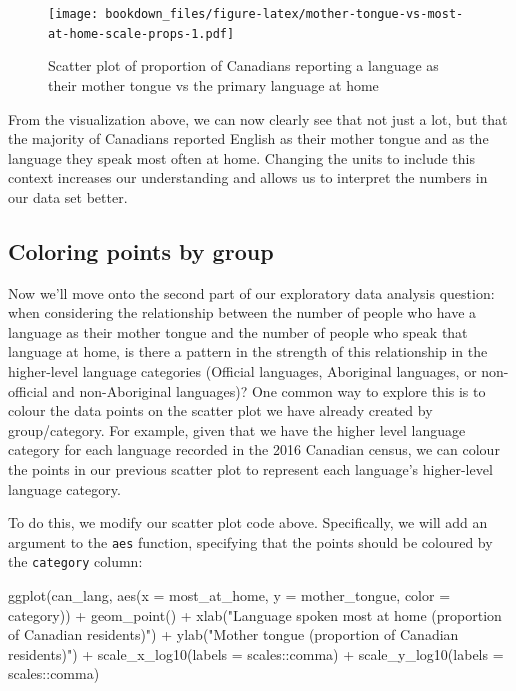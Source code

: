 \documentclass[
]{krantz}
\makeatletter
\newenvironment{Shaded}{\begin{snugshade}}{\end{snugshade}}
\newcommand{\AttributeTok}[1]{\textcolor[rgb]{0.61,0.61,0.61}{#1}}
\newcommand{\FunctionTok}[1]{\textcolor[rgb]{0,0,0}{#1}}
\newcommand{\NormalTok}[1]{#1}
\newcommand{\SpecialCharTok}[1]{\textcolor[rgb]{0,0,0}{#1}}
\newcommand{\StringTok}[1]{\textcolor[rgb]{0.5,0.5,0.5}{#1}}
\newenvironment{kframe}{%
\medskip{}
\setlength{\fboxsep}{.8em}
 \def\at@end@of@kframe{}%
 \ifinner\ifhmode%
  \def\at@end@of@kframe{\end{minipage}}%
  \begin{minipage}{\columnwidth}%
 \fi\fi%
 \def\FrameCommand##1{\hskip\@totalleftmargin \hskip-\fboxsep
 \colorbox{shadecolor}{##1}\hskip-\fboxsep
     \hskip-\linewidth \hskip-\@totalleftmargin \hskip\columnwidth}%
 \MakeFramed {\advance\hsize-\width
   \@totalleftmargin\z@ \linewidth\hsize
   \@setminipage}}%
 {\par\unskip\endMakeFramed%
 \at@end@of@kframe}
\renewenvironment{Shaded}{\begin{kframe}}{\end{kframe}}
\makeatother
\begin{document}
\begin{figure}
\centering
\texttt{[image: bookdown\_files/figure-latex/mother-tongue-vs-most-at-home-scale-props-1.pdf]}
\caption{\label{fig:mother-tongue-vs-most-at-home-scale-props}Scatter plot of proportion of Canadians reporting a language as their mother tongue vs the primary language at home}
\end{figure}

From the visualization above, we can now clearly see that not just a lot, but that the majority of Canadians reported English as their mother tongue and as the language they speak most often at home. Changing the units to include this context increases our understanding and allows us to interpret the numbers in our data set better.

\hypertarget{coloring-points-by-group}{%
\subsection{Coloring points by group}\label{coloring-points-by-group}}

Now we'll move onto the second part of our exploratory data analysis question: when considering the relationship between the number of people who have a language as their mother tongue and the number of people who speak that language at home, is there a pattern in the strength of this relationship in the higher-level language categories (Official languages, Aboriginal languages, or non-official and non-Aboriginal languages)? One common way to explore this is to colour the data points on the
scatter plot we have already created by group/category. For example,
given that we have the higher level language category for each language recorded in the 2016 Canadian census, we can colour the points in our previous
scatter plot to represent each language's higher-level language category.

To do this, we modify our scatter plot code above. Specifically, we will add an argument to the \texttt{aes} function, specifying that the points should be coloured by the \texttt{category} column:

\begin{Shaded}
\begin{Highlighting}[]
\FunctionTok{ggplot}\NormalTok{(can\_lang, }\FunctionTok{aes}\NormalTok{(}\AttributeTok{x =}\NormalTok{ most\_at\_home, }\AttributeTok{y =}\NormalTok{ mother\_tongue, }\AttributeTok{color =}\NormalTok{ category)) }\SpecialCharTok{+}
  \FunctionTok{geom\_point}\NormalTok{() }\SpecialCharTok{+}
  \FunctionTok{xlab}\NormalTok{(}\StringTok{"Language spoken most at home (proportion of Canadian residents)"}\NormalTok{) }\SpecialCharTok{+}
  \FunctionTok{ylab}\NormalTok{(}\StringTok{"Mother tongue (proportion of Canadian residents)"}\NormalTok{) }\SpecialCharTok{+}
  \FunctionTok{scale\_x\_log10}\NormalTok{(}\AttributeTok{labels =}\NormalTok{ scales}\SpecialCharTok{::}\NormalTok{comma) }\SpecialCharTok{+}
  \FunctionTok{scale\_y\_log10}\NormalTok{(}\AttributeTok{labels =}\NormalTok{ scales}\SpecialCharTok{::}\NormalTok{comma)}
\end{Highlighting}
\end{Shaded}
\end{document}
